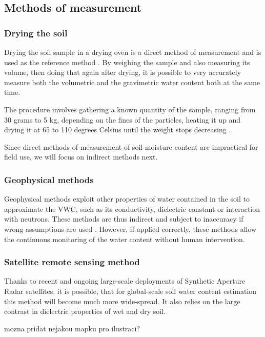 \subsection{Methods of measurement}
\subsubsection{Drying the soil}
Drying the soil sample in a drying oven is a direct method of measurement and is used as the reference method \cite{webster_humidity_1998}. By weighing the sample and also measuring its volume, then doing that again after drying, it is possible to very accurately measure both the volumetric and the gravimetric water content both at the same time.

The procedure involves gathering a known quantity of the sample, ranging from 30 grams to 5 kg, depending on the fines of the particles, heating it up and drying it at 65 to 110 degrees Celsius until the weight stops decreasing \cite{department_of_sustainable_natural_resources_soil_2024,myjove_corporation_determination_2024, paul_soil_2007}.

Since direct methods of measurement of soil moisture content are impractical for field use, we will focus on indirect methods next.

\subsubsection{Geophysical methods}
Geophysical methods exploit other properties of water contained in the soil to approximate the VWC, such as its conductivity, dielectric constant or interaction with neutrons. These methods are thus indirect and subject to inaccuracy if wrong assumptions are used \cite{webster_humidity_1998}. However, if applied correctly, these methods allow the continuous monitoring of the water content without human intervention. 

\subsubsection{Satellite remote sensing method}
Thanks to recent and ongoing large-scale deployments of Synthetic Aperture Radar satellites, it is possible, that for global-scale soil water content estimation this method will become much more wide-spread. It also relies on the large contrast in dielectric properties of wet and dry soil.

mozna pridat nejakou mapku pro ilustraci?
